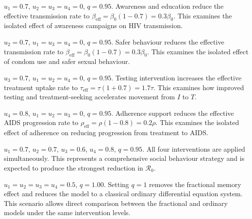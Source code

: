 \documentclass[12pt,a4paper,oneside]{report}
\newcommand{\Rzero}{\mathcal{R}_0}
\newcommand{\beff}{\beta_{\mathrm{eff}}}
\newcommand{\taueff}{\tau_{\mathrm{eff}}}
\newcommand{\rhoeff}{\rho_{\mathrm{eff}}}
\begin{document}
\begin{scenariobox}[title={Scenario 2 --- Awareness Only}]
$u_1=0.7$, $u_2=u_3=u_4=0$, $q=0.95$. Awareness and education reduce the effective transmission rate to $\beff=\beta_0(1-0.7)=0.3\beta_0$. This examines the isolated effect of awareness campaigns on HIV transmission.
\end{scenariobox}

\begin{scenariobox}[title={Scenario 3 --- Safer Sexual Behaviour Only}]
$u_2=0.7$, $u_1=u_3=u_4=0$, $q=0.95$. Safer behaviour reduces the effective transmission rate to $\beff=\beta_0(1-0.7)=0.3\beta_0$. This examines the isolated effect of condom use and safer sexual behaviour.
\end{scenariobox}

\begin{scenariobox}[title={Scenario 4 --- Testing and Treatment-Seeking Only}]
$u_3=0.7$, $u_1=u_2=u_4=0$, $q=0.95$. Testing intervention increases the effective treatment uptake rate to $\taueff=\tau(1+0.7)=1.7\tau$. This examines how improved testing and treatment-seeking accelerates movement from $I$ to $T$.
\end{scenariobox}

\begin{scenariobox}[title={Scenario 5 --- Treatment Adherence Only}]
$u_4=0.8$, $u_1=u_2=u_3=0$, $q=0.95$. Adherence support reduces the effective AIDS progression rate to $\rhoeff=\rho(1-0.8)=0.2\rho$. This examines the isolated effect of adherence on reducing progression from treatment to AIDS.
\end{scenariobox}

\begin{scenariobox}[title={Scenario 6 --- Combined Intervention}]
$u_1=0.7$, $u_2=0.7$, $u_3=0.6$, $u_4=0.8$, $q=0.95$. All four interventions are applied simultaneously. This represents a comprehensive social behaviour strategy and is expected to produce the strongest reduction in $\Rzero$.
\end{scenariobox}

\begin{scenariobox}[title={Scenario 7 --- Ordinary Model ($q=1$)}]
$u_1=u_2=u_3=u_4=0.5$, $q=1.00$. Setting $q=1$ removes the fractional memory effect and reduces the model to a classical ordinary differential equation system. This scenario allows direct comparison between the fractional and ordinary models under the same intervention levels.
\end{scenariobox}
\end{document}
